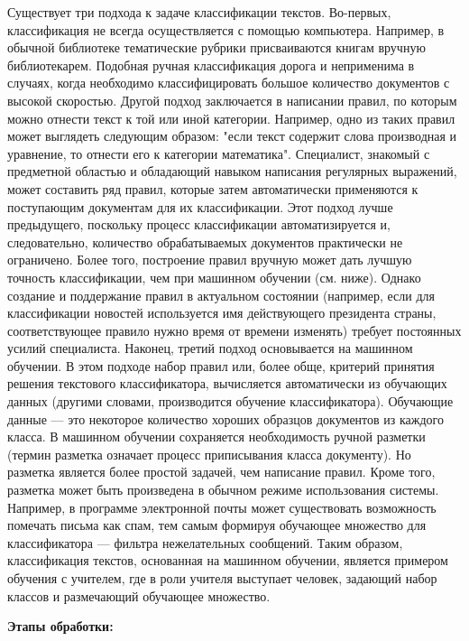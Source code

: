 \documentclass[14pt,a4paper]{extreport}
\begin{document}
    \par Существует три подхода к задаче классификации текстов. Во-первых, классификация не всегда осуществляется с помощью компьютера. Например, в обычной библиотеке тематические рубрики присваиваются книгам вручную библиотекарем. Подобная ручная классификация дорога и неприменима в случаях, когда необходимо классифицировать большое количество документов с высокой скоростью. Другой подход заключается в написании правил, по которым можно отнести текст к той или иной категории. Например, одно из таких правил может выглядеть следующим образом: "если текст содержит слова производная и уравнение, то отнести его к категории математика". Специалист, знакомый с предметной областью и обладающий навыком написания регулярных выражений, может составить ряд правил, которые затем автоматически применяются к поступающим документам для их классификации. Этот подход лучше предыдущего, поскольку процесс классификации автоматизируется и, следовательно, количество обрабатываемых документов практически не ограничено. Более того, построение правил вручную может дать лучшую точность классификации, чем при машинном обучении (см. ниже). Однако создание и поддержание правил в актуальном состоянии (например, если для классификации новостей используется имя действующего президента страны, соответствующее правило нужно время от времени изменять) требует постоянных усилий специалиста. Наконец, третий подход основывается на машинном обучении. В этом подходе набор правил или, более обще, критерий принятия решения текстового классификатора, вычисляется автоматически из обучающих данных (другими словами, производится обучение классификатора). Обучающие данные — это некоторое количество хороших образцов документов из каждого класса. В машинном обучении сохраняется необходимость ручной разметки (термин разметка означает процесс приписывания класса документу). Но разметка является более простой задачей, чем написание правил. Кроме того, разметка может быть произведена в обычном режиме использования системы. Например, в программе электронной почты может существовать возможность помечать письма как спам, тем самым формируя обучающее множество для классификатора — фильтра нежелательных сообщений. Таким образом, классификация текстов, основанная на машинном обучении, является примером обучения с учителем, где в роли учителя выступает человек, задающий набор классов и размечающий обучающее множество.
    \\ \par
    \textbf{Этапы обработки:}
\end{document}
